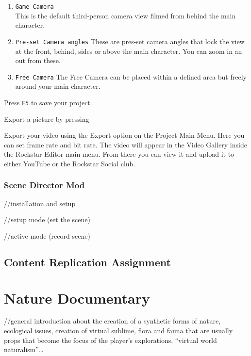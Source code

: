 \documentclass[
  openany]{book}
\begin{document}
\begin{enumerate}
\def\labelenumi{\arabic{enumi}.}
\item
  \texttt{Game\ Camera}~\\
  This is the default third-person camera view filmed from behind the main character.
\item
  \texttt{Pre-set\ Camera\ angles}
  These are pres-set camera angles that lock the view at the front, behind, sides or above the main character. You can zoom in an out from these.
\item
  \texttt{Free\ Camera}
  The Free Camera can be placed within a defined area but freely around your main character.
\end{enumerate}

Press \texttt{F5} to save your project.

Export a picture by pressing

Export your video using the Export option on the Project Main Menu. Here you can set frame rate and bit rate. The video will appear in the Video Gallery inside the Rockstar Editor main menu. From there you can view it and upload it to either YouTube or the Rockstar Social club.

\hypertarget{scene-director-mod}{%
\subsection*{Scene Director Mod}\label{scene-director-mod}}

//installation and setup

//setup mode (set the scene)

//active mode (record scene)

\hypertarget{content-replication-assignment-2}{%
\section*{Content Replication Assignment}\label{content-replication-assignment-2}}

\hypertarget{nature-documentary}{%
\chapter{Nature Documentary}\label{nature-documentary}}

//general introduction about the creation of a synthetic forms of nature, ecological issues, creation of virtual sublime, flora and fauna that are usually props that become the focus of the player's explorations, ``virtual world naturalism''\ldots{}
\end{document}

